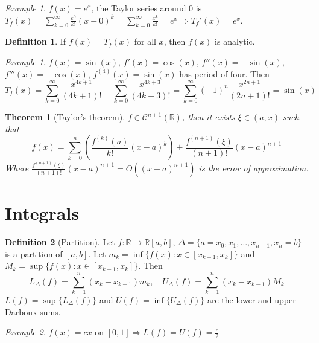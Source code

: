 \documentclass{article}
\newcommand{\DS}{\displaystyle}
\newcommand{\Ar}{\Rightarrow}
\newcommand{\fOnR}[1]{#1 : \mathbb{R} \rightarrow \mathbb{R}}
\newcommand{\intcc}[1]{\left[#1\right]}
\newcommand{\intoo}[1]{\left(#1\right)}
\theoremstyle{definition}
\newtheorem{definition}{Definition}[section]
\theoremstyle{definition}
\theoremstyle{plain}
\newtheorem{theorem}{Theorem}[section]
\theoremstyle{plain}
\theoremstyle{plain}
\theoremstyle{plain}
\theoremstyle{definition}
\theoremstyle{remark}
\newtheorem{exampled}{Example}[definition]
\theoremstyle{remark}
\theoremstyle{remark}
\newtheorem{examplet}{Example}[theorem]
\theoremstyle{remark}
\newcommand{\R}{\mathbb{R}}
\newcommand{\C}{\mathcal{C}}
\newcommand{\sumn}{\sum_{k=1}^n}
\begin{document}
\begin{examplet}
  $f(x) = e^x$, the Taylor series around 0 is $\DS T_f(x) = \sum_{k=0}^\infty \frac{e^0}{k!}(x-0)^k = \sum_{k=0}^\infty \frac{x^k}{k!} = e^x \Ar T_f'(x) = e^x$.
\end{examplet}


\begin{definition}
  If $f(x) = T_f(x)$ for all $x$, then $f(x)$ is analytic.
\end{definition}

\begin{exampled}
  $f(x) = \sin(x)$, $f'(x) = \cos(x)$, $f''(x) = -\sin(x)$, $f'''(x) = -\cos(x)$, $f^{(4)}(x) = \sin(x)$ has period of four. Then
  \[
  T_f(x) =
  \sum_{k=0}^\infty \frac{x^{4k+1}}{(4k+1)!} -
  \sum_{k=0}^\infty \frac{x^{4k+3}}{(4k+3)!} =
  \sum_{k=0}^\infty (-1)^n \frac{x^{2n+1}}{(2n+1)!} = \sin(x)
  \]
\end{exampled}


\begin{theorem}[Taylor's theorem]
  $f \in \C^{n+1}(\R)$, then it exists $\xi \in \intoo{a,x}$ such that
  \[
  f(x) =
  \sum_{k=0}^n \left( \frac{f^{(k)}(a)}{k!}(x-a)^k \right) +
  \frac{f^{(n+1)}(\xi)}{(n+1)!}(x-a)^{n+1}
  \]
  Where $\frac{f^{(n+1)}(\xi)}{(n+1)!}(x-a)^{n+1} = O((x-a)^{n+1})$ is the error of approximation.
\end{theorem}


\section{Integrals}


\begin{definition}[Partition]
  Let $\fOnR{f}{\intcc{a,b}}$, $\Delta = \{ a = x_0, x_1, \hdots, x_{n-1}, x_n = b \}$ is a partition of $\intcc{a,b}$. Let $m_k = \inf \{ f(x) : x \in \intcc{x_{k-1},x_k} \}$ and $M_k = \sup \{ f(x) : x \in \intcc{x_{k-1},x_k} \}$. Then
  \[
  L_\Delta(f) = \sumn (x_k - x_{k-1})m_k, \quad
  U_\Delta(f) = \sumn (x_k - x_{k-1})M_k
  \]
  $L(f) = \sup \{ L_\Delta(f) \}$ and $U(f) = \inf \{ U_\Delta(f) \}$ are the lower and upper Darboux sums.
\end{definition}

\begin{exampled}
  $f(x) = cx$ on $\intcc{0,1} \Ar L(f) = U(f) = \frac{c}{2}$
\end{exampled}
\end{document}
